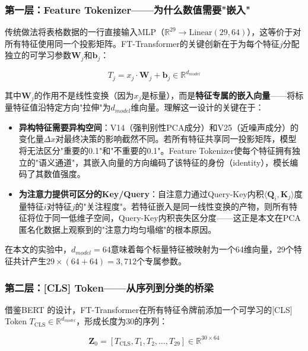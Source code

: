 \subsubsection{第一层：Feature Tokenizer——为什么数值需要"嵌入"}

传统做法将表格数据的一行直接输入MLP（$\mathbb{R}^{29} \to \text{Linear}(29, 64)$），这等价于对所有特征使用同一个投影矩阵。FT-Transformer的关键创新在于为每个特征$j$分配独立的可学习参数$\bm{W}_j$和$\bm{b}_j$：

\begin{equation}
T_j = x_j \cdot \bm{W}_j + \bm{b}_j \in \mathbb{R}^{d_{model}}
\label{eq:tokenize}
\end{equation}

其中$\bm{W}_j$的作用不是线性变换（因为$x_j$是标量），而是\textbf{特征专属的嵌入向量}——将标量特征值沿特定方向"拉伸"为$d_{model}$维向量。理解这一设计的关键在于：

\begin{itemize}
    \item \textbf{异构特征需要异构空间}：V14（强判别性PCA成分）和V25（近噪声成分）的变化量$\Delta x$对最终决策的影响截然不同。若所有特征共享同一投影矩阵，模型将无法区分"重要的0.1"和"不重要的0.1"。Feature Tokenizer使每个特征拥有独立的"语义通道"，其嵌入向量的方向编码了该特征的身份（identity），模长编码了其数值强度。
    \item \textbf{为注意力提供可区分的Key/Query}：自注意力通过Query-Key内积$\langle \bm{Q}_i, \bm{K}_j \rangle$度量特征$i$对特征$j$的"关注程度"。若特征嵌入是同一线性变换的产物，则所有特征将位于同一低维子空间，Query-Key内积丧失区分度——这正是本文在PCA匿名化数据上观察到的"注意力均匀塌缩"的根本原因。
\end{itemize}

在本文的实验中，$d_{model}=64$意味着每个标量特征被映射为一个64维向量，29个特征共计产生$29 \times (64 + 64) = 3,\!712$个专属参数。

\subsubsection{第二层：[CLS] Token——从序列到分类的桥梁}

借鉴BERT \cite{devlin2018bert}的设计，FT-Transformer在所有特征令牌前添加一个可学习的[CLS] Token $T_{\mathrm{CLS}} \in \mathbb{R}^{d_{model}}$，形成长度为30的序列：

\begin{equation}
\mathbf{Z}_0 = [T_{\mathrm{CLS}}, T_1, T_2, \dots, T_{29}] \in \mathbb{R}^{30 \times 64}
\end{equation}


